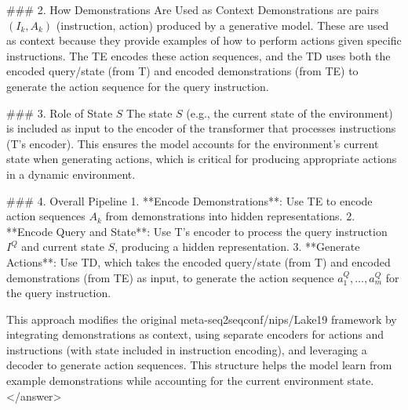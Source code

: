 ### 2. How Demonstrations Are Used as Context  
Demonstrations are pairs \( (I_k, A_k) \) (instruction, action) produced by a generative model. These are used as context because they provide examples of how to perform actions given specific instructions. The TE encodes these action sequences, and the TD uses both the encoded query/state (from T) and encoded demonstrations (from TE) to generate the action sequence for the query instruction.  


### 3. Role of State \( S \)  
The state \( S \) (e.g., the current state of the environment) is included as input to the encoder of the transformer that processes instructions (T’s encoder). This ensures the model accounts for the environment’s current state when generating actions, which is critical for producing appropriate actions in a dynamic environment.  


### 4. Overall Pipeline  
1. **Encode Demonstrations**: Use TE to encode action sequences \( A_k \) from demonstrations into hidden representations.  
2. **Encode Query and State**: Use T’s encoder to process the query instruction \( I^Q \) and current state \( S \), producing a hidden representation.  
3. **Generate Actions**: Use TD, which takes the encoded query/state (from T) and encoded demonstrations (from TE) as input, to generate the action sequence \( a^Q_1, \dots, a^Q_m \) for the query instruction.  


This approach modifies the original meta-seq2seqconf/nips/Lake19 framework by integrating demonstrations as context, using separate encoders for actions and instructions (with state included in instruction encoding), and leveraging a decoder to generate action sequences. This structure helps the model learn from example demonstrations while accounting for the current environment state.</answer>